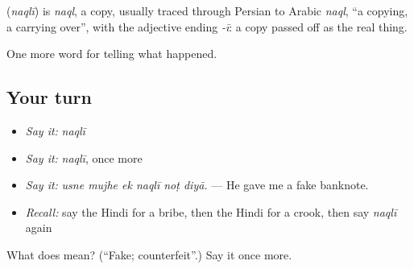 \begin{cousinweb}
\textbf{} (\emph{naqlī}) is \emph{naql}, a copy, usually traced through Persian to Arabic \emph{naql}, \textquotedblleft{}a copying, a carrying over\textquotedblright{}, with the adjective ending \emph{-ī}: a copy passed off as the real thing.
\end{cousinweb}

\begin{grammarlens}[title={What you've built}]
One more word for telling what happened.
\end{grammarlens}

\subsection*{Your turn}
\begin{itemize}
\raggedright
  \item \emph{Say it:} \emph{naqlī}
  \item \emph{Say it:} \emph{naqlī}, once more
  \item \emph{Say it:} \emph{usne mujhe ek naqlī noṭ diyā.} — He gave me a fake banknote.
  \item \emph{Recall:} say the Hindi for a bribe, then the Hindi for a crook, then say \emph{naqlī} again
\end{itemize}

\begin{tcolorbox}[breakable,colback=teal!4,colframe=teal!35!black,title={Before you move on}]
What does  mean? (\textquotedblleft{}Fake; counterfeit\textquotedblright{}.) Say it once more.
\end{tcolorbox}
